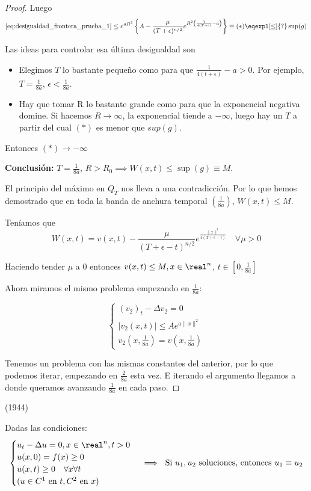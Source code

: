 \begin{proof}
				Luego
				\[ \ref{eq:desigualdad_frontera_prueba_1} \leq e^{aR^2} \left\{A-\frac{\mu}{(T+\epsilon)^{n/2}} e^{R^2 \left(\frac{1}{4(T+\epsilon)}-a \right)} \right\} \equiv (*)\eqexpl[\leq]{?} \sup(g) \]

				Las ideas para controlar esa última desigualdad son
				\begin{itemize}
					\item Elegimos $T$ lo bastante pequeño como para que $\frac{1}{4(t+\epsilon)}-a > 0$. Por ejemplo, $T = \frac{1}{8a}$, $\epsilon < \frac{1}{8a}$.
					\item Hay que tomar R lo bastante grande como para que la exponencial negativa domine. Si hacemos $R \to \infty$, la exponencial tiende a $- \infty$, luego hay un $T$ a partir del cual $(*)$ es menor que $sup(g)$.
				\end{itemize}

				Entonces $(*) \to - \infty$

				\textbf{Conclusión:} $T = \frac{1}{8a}$, $R > R_0 \implies W(x,t) \leq \sup(g) \equiv M$.

				El principio del máximo en $Q_T$ nos lleva a una contradicción. Por lo que hemos demostrado que en toda la banda de anchura temporal $(\frac{1}{8a})$, $W(x,t) \leq M$.

				Teníamos que
				\[ W(x,t) = v(x,t) - \frac{\mu}{(T + \epsilon -t)^{n/2}} e^{\frac{\|x\|^2}{4(T + \epsilon - t)}} \quad \forall \mu > 0 \]

				Haciendo tender $\mu$ a 0 entonces $v(x,t) \leq M, x \in \real^n$, $t \in [0,\frac{1}{8a}]$

				Ahora miramos el mismo problema empezando en $\frac{1}{8a}$:

				\[\begin{cases}
					(v_2)_t - \Delta v_2 = 0 \\
					|v_2(x,t)| \leq A e^{a\|x\|^2} \\
					v_2(x,\frac{1}{8a}) = v(x,\frac{1}{8a})
				\end{cases}\]


				Tenemos un problema con las mismas constantes del anterior, por lo que podemos iterar, empezando en $\frac{2}{8a}$ esta vez. E iterando el argumento llegamos a donde queramos avanzando $\frac{1}{8a}$ en cada paso.

			\end{proof}

			\begin{theorem} (1944)

				Dadas las condiciones:
				\[\begin{cases}
					u_t - \Delta u = 0, x \in \real^n, t > 0 \\
					u(x,0) = f(x) \geq 0 \\
					u(x,t) \geq 0 \quad \forall x \forall t \\
					(u \in C^1 \text{ en } t, C^2 \text{ en } x)
				\end{cases} \implies \text{ Si } u_1,u_2 \text{ soluciones, entonces } u_1 \equiv u_2\]
			\end{theorem}


